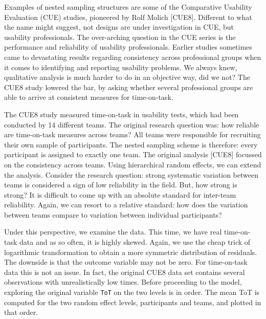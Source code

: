 \documentclass[]{svmono}
\begin{document}
Examples of nested sampling structures are some of the Comparative
Usability Evaluation (CUE) studies, pioneered by Rolf Molich {[}CUE8{]}.
Different to what the name might suggest, not designs are under
investigation in CUE, but usability professionals. The over-arching
question in the CUE series is the performance and reliability of
usability professionals. Earlier studies sometimes came to devastating
results regarding consistency across professional groups when it comes
to identifying and reporting usability problems. We always knew,
qualitative analysis is much harder to do in an objective way, did we
not? The CUE8 study lowered the bar, by asking whether several
professional groups are able to arrive at consistent measures for
time-on-task.

The CUE8 study measured time-on-task in usability tests, which had been
conducted by 14 different teams. The original research question was: how
reliable are time-on-task measures across teams? All teams were
responsible for recruiting their own sample of participants. The nested
sampling scheme is therefore: every participant is assigned to exactly
one team. The original analysis {[}CUE8{]} focussed on the consistency
across teams. Using hierarchical random effects, we can extend the
analysis. Consider the research question: strong systematic variation
between teams is considered a sign of low reliability in the field. But,
how strong is strong? It is difficult to come up with an absolute
standard for inter-team reliability. Again, we can resort to a relative
standard: how does the variation between teams compare to variation
between individual participants?

Under this perspective, we examine the data. This time, we have real
time-on-task data and as so often, it is highly skewed. Again, we use
the cheap trick of logarithmic transformation to obtain a more symmetric
distribution of residuals. The downside is that the outcome variable may
not be zero. For time-on-task data this is not an issue. In fact, the
original CUE8 data set contains several observations with
unrealistically low times. Before proceeding to the model, exploring the
original variable \texttt{ToT} on the two levels is in order. The mean
ToT is computed for the two random effect levels, participants and
teams, and plotted in that order.
\end{document}
